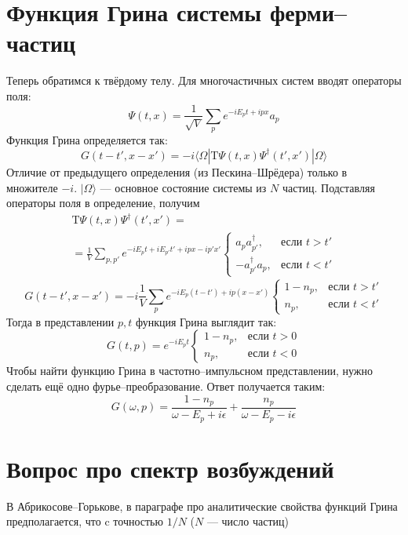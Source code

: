 \documentclass{article}
\begin{document}
\section{Функция Грина системы ферми--частиц}
Теперь обратимся к твёрдому телу. Для многочастичных систем вводят операторы поля:
	\begin{equation}
		\Psi(t,x) = \frac{1}{\sqrt{V}}\sum_p e^{-iE_pt + ipx}a_p
	\end{equation}
Функция Грина определяется так:
	\begin{equation}
		G(t - t', x - x') = -i\langle \Omega |\mathrm{T} 
					\Psi(t,x) \Psi^\dagger (t', x') | \Omega \rangle
	\end{equation}
Отличие от предыдущего определения (из Пескина--Шрёдера) только в множителе $-i$.
$|\Omega\rangle$ --- основное состояние системы из $N$ частиц.
Подставляя операторы поля в определение, получим
	\begin{multline}
		\mathrm{T}\Psi(t,x) \Psi^\dagger (t', x')=\\
			 =\frac{1}{V}\sum_{p,p'} e^{-i E_p t + iE_{p'} t' + ipx - ip'x'} 
				\left\{
				\begin{array}{cl}
					a_p a^{\dagger}_{p'}, & \mbox{если } t > t' \\
					-a^{\dagger}_{p'} a_p, & \mbox{если } t < t' 
				\end{array}
				\right.
	\end{multline}
	\begin{equation}
		G(t - t', x - x') = -i\frac{1}{V}\sum_p e^{-iE_p(t-t') + ip(x-x')}
				\left\{
				\begin{array}{cl}
					1-n_p, & \mbox{если } t > t' \\
					n_p,   & \mbox{если } t < t' 
				\end{array}
				\right.
	\end{equation}
	Тогда в представлении $p,t$ функция Грина выглядит так:
	\begin{equation}
		G(t,p) = e^{-iE_pt}
				\left\{
				\begin{array}{cl}
					1-n_p, & \mbox{если } t > 0 \\
					n_p,   & \mbox{если } t < 0 
				\end{array}
				\right.
	\end{equation}
	Чтобы найти функцию Грина в частотно--импульсном представлении, нужно сделать ещё
	одно фурье--преобразование.
	Ответ получается таким:
	\begin{equation}
		G(\omega, p) = \frac{1-n_p}{\omega - E_p + i\epsilon} + 
						\frac{n_p}{\omega - E_p - i\epsilon}
	\end{equation}	
	\section{Вопрос про спектр возбуждений}
	В Абрикосове--Горькове, в параграфе про аналитические свойства
	функций Грина предполагается, что c точностью $1/N$ ($N$ --- число 
	частиц) 
\end{document}
